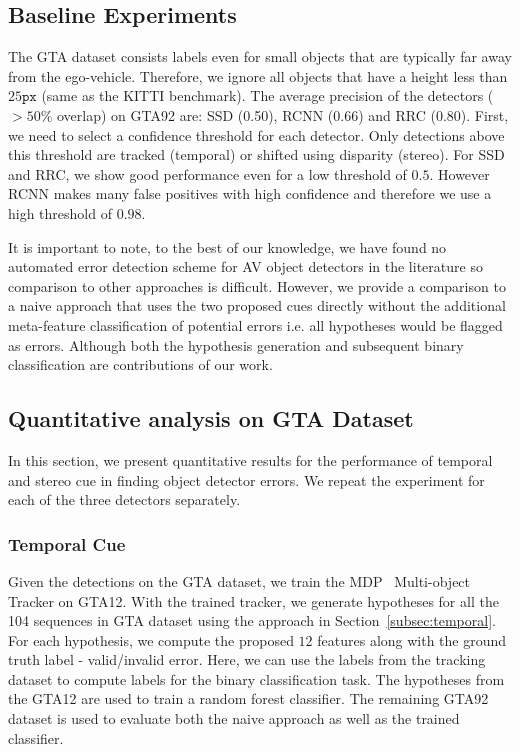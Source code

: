 \documentclass[letterpaper, 10 pt, journal, twoside]{IEEEtran}  %
\begin{document}
\subsection{Baseline Experiments}
\label{sec:baseline}

The GTA dataset consists labels even for small objects that are typically far away from the ego-vehicle. Therefore, we ignore all objects that have a height less than $25\mathtt{px}$ (same as the KITTI benchmark). The average precision of the detectors ($>50\%$ overlap) on GTA92 are: SSD (0.50), RCNN (0.66) and RRC (0.80). First, we need to select a confidence threshold for each detector. Only detections above this threshold are tracked (temporal) or shifted using disparity (stereo). For SSD and RRC, we show good performance even for a low threshold of $0.5$. However RCNN makes many false positives with high confidence and therefore we use a high threshold of $0.98$. 

It is important to note, to the best of our knowledge, we have found no automated error detection scheme for AV object detectors in the literature so comparison to other approaches is difficult. 
However, we provide a comparison to a naive approach that uses the two proposed cues directly without the additional meta-feature classification of potential errors i.e. all hypotheses would be flagged as errors. 
Although both the hypothesis generation and subsequent binary classification are contributions of our work.

\subsection{Quantitative analysis on GTA Dataset}
\label{sec:synthetic_data}
In this section, we present quantitative results for the performance of temporal and stereo cue in finding object detector errors. We repeat the experiment for each of the three detectors separately.

\subsubsection{Temporal Cue} 
Given the detections on the GTA dataset, we train the MDP~\cite{Xiang_2015_ICCV} Multi-object Tracker on GTA12. With the trained tracker, we generate hypotheses for all the 104 sequences in GTA dataset using the approach in Section~\ref{subsec:temporal}. For each hypothesis, we compute the proposed $12$ features along with the ground truth label - valid/invalid error. Here, we can use the labels from the tracking dataset to compute labels for the binary classification task. The hypotheses from the GTA12 are used to train a random forest classifier. The remaining GTA92 dataset is used to evaluate both the naive approach as well as the trained classifier.  
\end{document}
